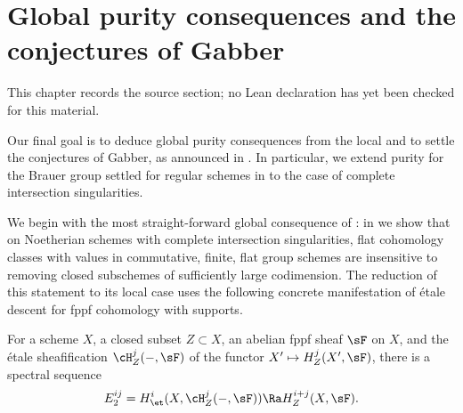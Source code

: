 \chapter{Global purity consequences and the conjectures of Gabber}
\label{purity-flat-cohomology-chapter-07}

\begin{remark}
\label{purity-flat-cohomology-chapter-07-source}
This chapter records the source section; no Lean declaration has yet been checked for this material.
\notready
\end{remark}

\label{global}



Our final goal is to deduce global purity consequences from the local  %
and to settle the conjectures of Gabber, as announced in . In particular, we extend purity for the Brauer group settled for regular schemes in \cite{brauer-purity} to the case of complete intersection singularities.















We begin with the most straight-forward global consequence of : in  we show that on Noetherian schemes with complete intersection singularities, flat cohomology classes with values in commutative, finite, flat group schemes are insensitive to removing closed subschemes of sufficiently large codimension. The reduction of this statement to its local case uses the following concrete manifestation of \'{e}tale descent for fppf cohomology with supports.

\blem \label{lem-sup-ss}
For a scheme $X$, a closed subset $Z \subset X$, an abelian fppf sheaf $\sF$ on $X$, and the \'{e}tale sheafification $\cH^j_Z(-, \sF)$ of the functor $X' \mapsto H^j_Z(X', \sF)$, there is a %
spectral sequence
\[
E_2^{ij} = H^i_\et(X, \cH^j_Z(-, \sF)) \Ra H^{i + j}_Z(X, \sF).
\]
\elem


